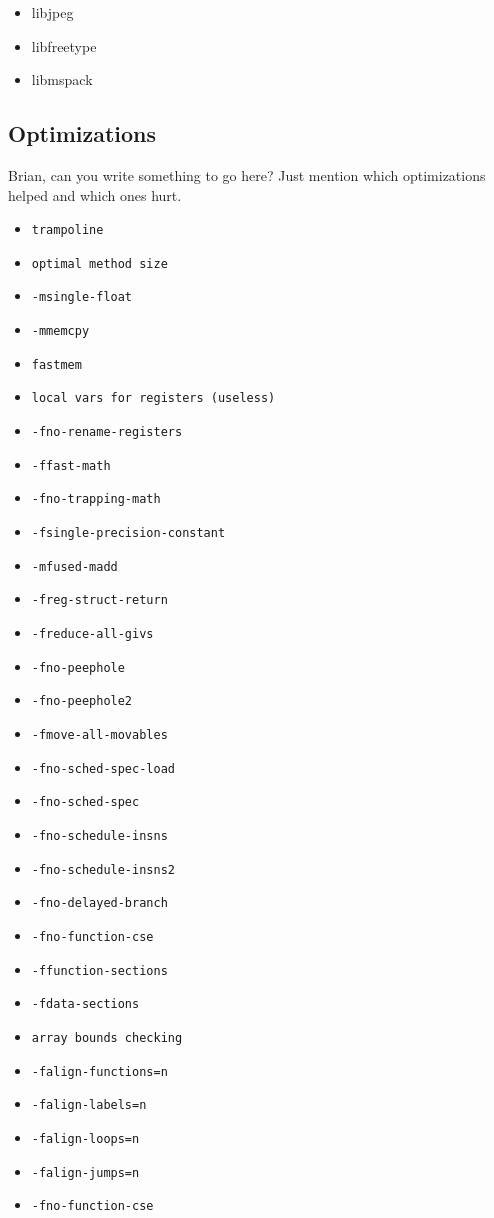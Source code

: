 \documentclass{acmconf}
\begin{document}
\begin{itemize}
\item libjpeg
\item libfreetype
\item libmspack
\end{itemize}


\subsection{Optimizations}

Brian, can you write something to go here?  Just mention which
optimizations helped and which ones hurt.

\begin{itemize}
\item {\tt trampoline}
\item {\tt optimal method size}
\item {\tt -msingle-float}
\item {\tt -mmemcpy}
\item {\tt fastmem}
\item {\tt local vars for registers (useless)}
\item {\tt -fno-rename-registers}
\item {\tt -ffast-math}
\item {\tt -fno-trapping-math}
\item {\tt -fsingle-precision-constant}
\item {\tt -mfused-madd}
\item {\tt -freg-struct-return}
\item {\tt -freduce-all-givs}
\item {\tt -fno-peephole}
\item {\tt -fno-peephole2}
\item {\tt -fmove-all-movables}
\item {\tt -fno-sched-spec-load}
\item {\tt -fno-sched-spec}
\item {\tt -fno-schedule-insns}
\item {\tt -fno-schedule-insns2}
\item {\tt -fno-delayed-branch}
\item {\tt -fno-function-cse}
\item {\tt -ffunction-sections}
\item {\tt -fdata-sections}
\item {\tt array bounds checking}
\item {\tt -falign-functions=n}
\item {\tt -falign-labels=n}
\item {\tt -falign-loops=n}
\item {\tt -falign-jumps=n}
\item {\tt -fno-function-cse}
\end{itemize}
\end{document}

